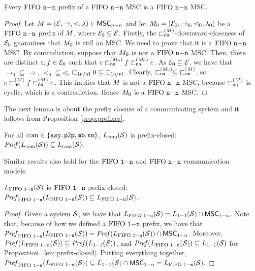 \begin{proposition}
	\label{prop:prefixes-nn}
	Every $\nn$ prefix of a $\nn$ MSC is a $\nn$ MSC.
\end{proposition}
\begin{proof}
	Let $\msc = (\Events, \procrel, \lhd, \lambda) \in \nnMSCs$ and let $\msc_0 =
	(\Events_0, \procrel_0, \lhd_0, \lambda_0)$ be a $\nn$ prefix of $\msc$, where $\Events_0 \subseteq \Events$. Firstly, the $\nnbowtieofmsc\msc$-downward-closeness of $\Events_0$ guarantees that ${\msc_0}$ is still an MSC. We need to prove that it is a $\nn$ MSC. By contradiction, suppose that $\msc_0$ is not a $\nn$ MSC. Then, there are distinct $e,f \in \Events_0$ such that $e \nnbowtieofmsc{\msc_0} f \nnbowtieofmsc{\msc_0} e$. As $\Events_0 \subseteq \Events$, we have that ${\rightarrow_0} \subseteq {\rightarrow}$, ${\lhd_0} \subseteq {\lhd}$, ${\nnrel0} \subseteq {\nnrel}$. Clearly, $\nnbowtieofmsc{\msc_0} \subseteq\; \nnbowtieofmsc\msc$, so $e \nnbowtieofmsc\msc f \nnbowtieofmsc\msc e$. This implies that $\msc$ is not a $\nn$ MSC, because $\nnbowtieofmsc\msc$ is cyclic, which is a contradiction. Hence $\msc_0$ is a $\nn$ MSC.
\end{proof}

The next lemma is about the prefix closure of a communicating system and it follows from Proposition \ref{prop:prefixes}.

\begin{proposition}\label{lem:co-prefix-closed}
	For all $\comsymb \in \{\asy, \ppsymb, \mbsymb, \cosymb\}$, $\cL{\Sys}$ is prefix-closed:
	$\Pref{\cL{\Sys}} \subseteq \cL{\Sys}$.
\end{proposition}

Similar results also hold for the $\onen$ and $\nn$ communication models.

\begin{proposition}\label{lem:onen-prefix-closed}
	$\onenL{\Sys}$ is $\onen$ prefix-closed:
	$\Prefonen{\onenL{\Sys}} \subseteq \onenL{\Sys}$.
\end{proposition}
\begin{proof}
	Given a system $\System$, we have that $\onenL{\System} = \ppL{\System} \cap \onenMSCs$. Note that, because of how we defined a $\onen$ prefix, we have that $\Prefonen{\onenL{\Sys}} = \Pref{\onenL{\Sys}} \cap \onenMSCs$. Moreover, $\Pref{\onenL{\Sys}} \subseteq \Pref{\ppL{\Sys}}$, and $\Pref{\onenL{\Sys}} \subseteq \ppL{\Sys}$ for Proposition~\ref{lem:prefix-closed}. Putting everything together, $\Prefonen{\onenL{\Sys}} \subseteq \ppL{\Sys} \cap \onenMSCs = \onenL{\System}$.
\end{proof}

